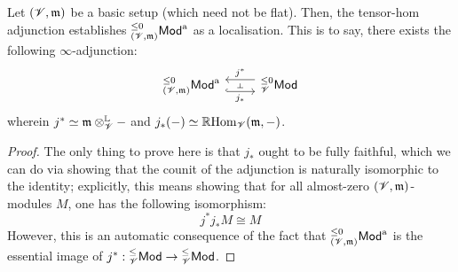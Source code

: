                     \begin{proposition} \label{prop: localising_at_almost_modules}
                        Let $(\mathscr{V}, \mathfrak{m})$ be a basic setup (which need not be flat). Then, the tensor-hom adjunction establishes ${}_{(\mathscr{V}, \mathfrak{m})}^{\leq 0}\mathsf{Mod}^{\mathrm{a}}$ as a localisation. This is to say, there exists the following $\infty$-adjunction:
                            $$
                                \begin{tikzcd}
                                	{{}_{(\scrV, \m)}^{\leq 0}\Mod^{\almost}} & {{}_{\scrV}^{\leq 0}\Mod}
                                	\arrow[""{name=0, anchor=center, inner sep=0}, "{j_*}"', shift right=2, hook, from=1-1, to=1-2]
                                	\arrow[""{name=1, anchor=center, inner sep=0}, "{j^*}"', shift right=2, from=1-2, to=1-1]
                                	\arrow["\dashv"{anchor=center, rotate=-90}, draw=none, from=1, to=0]
                                \end{tikzcd}
                            $$
                        wherein $j^* \cong \m \tensor_{\scrV}^{\L} -$ and $j_*(-) \simeq \mathbb{R}\mathrm{Hom}_{\mathscr{V}}(\mathfrak{m}, -)$.
                    \end{proposition}
                        \begin{proof}
                            The only thing to prove here is that $j_*$ ought to be fully faithful, which we can do via showing that the counit of the adjunction is naturally isomorphic to the identity; explicitly, this means showing that for all almost-zero $(\mathscr{V}, \mathfrak{m})$-modules $M$, one has the following isomorphism:
                                $$j^* j_* M \cong M$$
                            However, this is an automatic consequence of the fact that ${}_{(\mathscr{V}, \mathfrak{m})}^{\leq 0}\mathsf{Mod}^{\mathrm{a}}$ is the essential image of $j^*: {}_{\mathscr{V}}^{\leq}\mathsf{Mod} \to {}_{\mathscr{V}}^{\leq}\mathsf{Mod}$.
                        \end{proof}
                    
